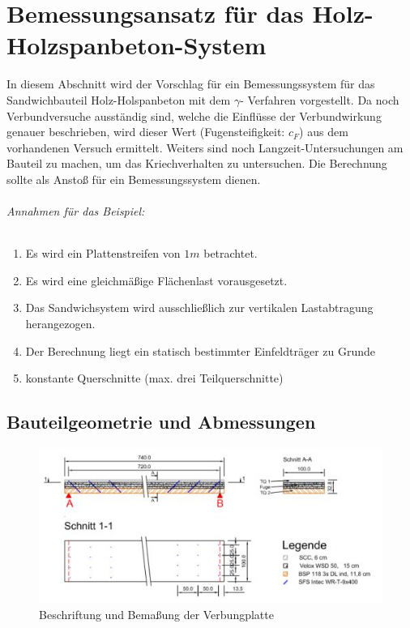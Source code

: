 

\chapter{Bemessungsansatz für das Holz-Holzspanbeton-System}
In diesem Abschnitt wird der Vorschlag für ein Bemessungssystem für das Sandwichbauteil
Holz-Holspanbeton mit dem $\gamma$- Verfahren vorgestellt. Da noch Verbundversuche ausständig sind, welche die Einflüsse der Verbundwirkung genauer beschrieben, wird dieser Wert (Fugensteifigkeit: $c_{F}$) aus dem vorhandenen Versuch ermittelt. Weiters sind noch Langzeit-Untersuchungen am Bauteil zu machen, um das Kriechverhalten zu untersuchen. Die Berechnung sollte als Anstoß für ein Bemessungssystem dienen.\\

\subparagraph{Annahmen für das Beispiel:}

\begin{enumerate}
\item Es wird ein Plattenstreifen von $1m$ betrachtet.
\item Es wird eine gleichmäßige Flächenlast vorausgesetzt.
\item Das Sandwichsystem wird ausschließlich zur vertikalen Lastabtragung herangezogen.
\item Der Berechnung liegt ein statisch bestimmter Einfeldträger zu Grunde
\item konstante Querschnitte (max. drei Teilquerschnitte)
\end{enumerate}

\newpage

\section{Bauteilgeometrie und Abmessungen}

\begin{figure}[h!]
\begin{center}
\includegraphics[scale =1.3]{Berechnungen/abbildungen/verbundplatte.JPG}
\caption{Beschriftung und Bemaßung der Verbungplatte}
\label{verbundplatte}
\end{center}
\end{figure}
